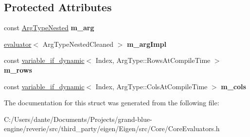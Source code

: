 \subsection*{Protected Attributes}
\begin{DoxyCompactItemize}
\item 
\mbox{\label{struct_eigen_1_1internal_1_1unary__evaluator_3_01_replicate_3_01_arg_type_00_01_row_factor_00_01_col_factor_01_4_01_4_a3bef0170821ffca1eeac2e571984e618}} 
const \mbox{\hyperlink{struct_eigen_1_1internal_1_1true__type}{Arg\+Type\+Nested}} {\bfseries m\+\_\+arg}
\item 
\mbox{\label{struct_eigen_1_1internal_1_1unary__evaluator_3_01_replicate_3_01_arg_type_00_01_row_factor_00_01_col_factor_01_4_01_4_a9dc15ac07a776d20a9612c2d04e766f2}} 
\mbox{\hyperlink{struct_eigen_1_1internal_1_1evaluator}{evaluator}}$<$ Arg\+Type\+Nested\+Cleaned $>$ {\bfseries m\+\_\+arg\+Impl}
\item 
\mbox{\label{struct_eigen_1_1internal_1_1unary__evaluator_3_01_replicate_3_01_arg_type_00_01_row_factor_00_01_col_factor_01_4_01_4_ac6ec2960821d55102ef914c1e5372fed}} 
const \mbox{\hyperlink{class_eigen_1_1internal_1_1variable__if__dynamic}{variable\+\_\+if\+\_\+dynamic}}$<$ Index, Arg\+Type\+::\+Rows\+At\+Compile\+Time $>$ {\bfseries m\+\_\+rows}
\item 
\mbox{\label{struct_eigen_1_1internal_1_1unary__evaluator_3_01_replicate_3_01_arg_type_00_01_row_factor_00_01_col_factor_01_4_01_4_a6eb87502cae049d11d68481851d36604}} 
const \mbox{\hyperlink{class_eigen_1_1internal_1_1variable__if__dynamic}{variable\+\_\+if\+\_\+dynamic}}$<$ Index, Arg\+Type\+::\+Cols\+At\+Compile\+Time $>$ {\bfseries m\+\_\+cols}
\end{DoxyCompactItemize}


The documentation for this struct was generated from the following file\+:\begin{DoxyCompactItemize}
\item 
C\+:/\+Users/dante/\+Documents/\+Projects/grand-\/blue-\/engine/reverie/src/third\+\_\+party/eigen/\+Eigen/src/\+Core/Core\+Evaluators.\+h\end{DoxyCompactItemize}
